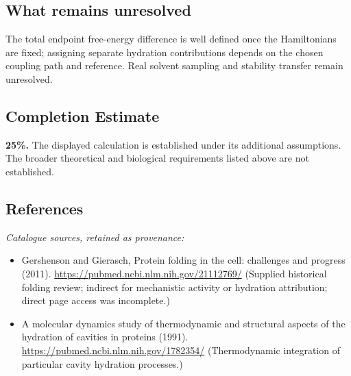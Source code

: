 \documentclass[11pt]{article}
\begin{document}
\subsection{What remains unresolved}
The total endpoint free-energy difference is well defined once the Hamiltonians are fixed; assigning separate hydration contributions depends on the chosen coupling path and reference. Real solvent sampling and stability transfer remain unresolved.
\subsection{Completion Estimate}
\textbf{25\%.} The displayed calculation is established under its additional assumptions. The broader theoretical and biological requirements listed above are not established.
\subsection{References}
\noindent\emph{Catalogue sources, retained as provenance:}
\begin{itemize}
\item Gershenson and Gierasch, Protein folding in the cell: challenges and progress (2011). \url{https://pubmed.ncbi.nlm.nih.gov/21112769/} (Supplied historical folding review; indirect for mechanistic activity or hydration attribution; direct page access was incomplete.)
\item A molecular dynamics study of thermodynamic and structural aspects of the hydration of cavities in proteins (1991). \url{https://pubmed.ncbi.nlm.nih.gov/1782354/} (Thermodynamic integration of particular cavity hydration processes.)
\end{itemize}
\clearpage


\appendix
\end{document}
